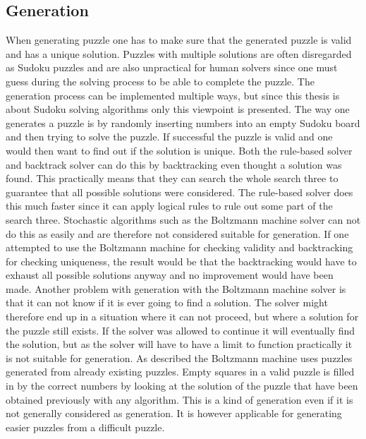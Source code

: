 \documentclass[a4paper,11pt]{kth-mag}
\begin{document}
\subsection{Generation}
When generating puzzle one has to make sure that the generated puzzle is valid and has a unique solution.
Puzzles with multiple solutions are often disregarded as Sudoku puzzles and are also unpractical for human solvers since one must guess during the solving process to be able to complete the puzzle. The generation process can be implemented multiple ways, but since this thesis is about Sudoku solving algorithms only this viewpoint is presented.
The way one generates a puzzle is by randomly inserting numbers into an empty Sudoku board and then trying to solve the puzzle. If successful the puzzle is valid and one would then want to find out if the solution is unique. 
Both the rule-based solver and backtrack solver can do this by backtracking even thought a solution was found. This practically means that they can search the whole search three to guarantee that all possible solutions were considered.
The rule-based solver does this much faster since it can apply logical rules to rule out some part of the search three.
Stochastic algorithms such as the Boltzmann machine solver can not do this as easily and are therefore not considered suitable for generation.
If one attempted to use the Boltzmann machine for checking validity and backtracking for checking uniqueness, the result would be that the backtracking would have to exhaust all possible solutions anyway and no improvement would have been made.
Another problem with generation with the Boltzmann machine solver is that it can not know if it is ever going to find a solution.
The solver might therefore end up in a situation where it can not proceed, but where a solution for the puzzle still exists.
If the solver was allowed to continue it will eventually find the solution, but as the solver will have to have a limit to function practically it is not suitable for generation.
As described the Boltzmann machine uses puzzles generated from already existing puzzles.
Empty squares in a valid puzzle is filled in by the correct numbers by looking at the solution of the puzzle that have been obtained previously with any algorithm.
This is a kind of generation even if it is not generally considered as generation.
It is however applicable for generating easier puzzles from a difficult puzzle.
\end{document}

